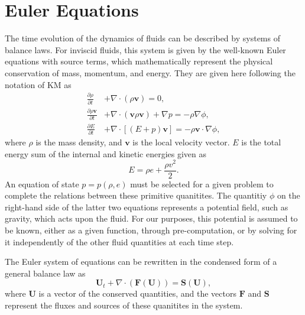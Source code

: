 \section{Euler Equations}
\label{sec:euler}

The time evolution of the dynamics of fluids can be described by systems of balance laws. For inviscid fluids, this system is given by the well-known Euler equations with source terms, which mathematically represent the physical conservation of mass, momentum, and energy. They are given here following the notation of KM as
\begin{subequations} \label{eq:eulerFull}
\begin{align}
\frac{\partial{\rho}}{\partial{t}} &+ \nabla \cdot (\rho \mathbf{v}) = 0, \label{eq:eulerContinuity} \\
\frac{\partial{\rho \mathbf{v}}}{\partial{t}} &+ \nabla \cdot (\mathbf{v} \rho \mathbf{v}) + \nabla p = -\rho \nabla \phi, \label{eq:eulerMomentum} \\
\frac{\partial{E}}{\partial{t}} &+ \nabla \cdot \left[(E+p)\mathbf{v}\right] = -\rho \mathbf{v} \cdot \nabla \phi,  \label{eq:eulerEnergy} 
\end{align}
\end{subequations}
where $\rho$ is the mass density, and $\mathbf{v}$ is the local velocity vector. $E$ is the total energy sum of the internal and kinetic energies given as
\begin{equation}
E=\rho e + \frac{\rho v^2}{2}.
\end{equation}
An equation of state $p=p(\rho,e)$ must be selected for a given problem to complete the relations between these primitive quanitites. The quantitiy $\phi$ on the right-hand side of the latter two equations represents a potential field, such as gravity, which acts upon the fluid. For our purposes, this potential is assumed to be known, either as a given function, through pre-computation, or by solving for it independently of the other fluid quantities at each time step.

The Euler system of equations can be rewritten in the condensed form of a general balance law as
\begin{equation} \label{eq:euler}
\mathbf{U}_t+\nabla\cdot(\mathbf{F}(\mathbf{U}))=\mathbf{S}(\mathbf{U}),
\end{equation}
where $\mathbf{U}$ is a vector of the conserved quantities, and the vectors $\mathbf{F}$ and $\mathbf{S}$ represent the fluxes and sources of these quanitites in the system.

